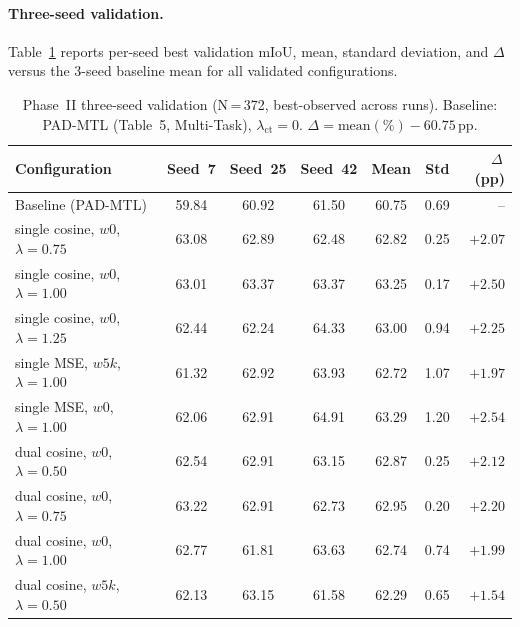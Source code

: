 \paragraph{Three-seed validation.}
Table~\ref{tab:ct-phase2-3seeds} reports per-seed best validation mIoU,
mean, standard deviation, and $\Delta$ versus the 3-seed baseline mean
for all validated configurations.

\begin{table}[H]
\centering
\caption{Phase~II three-seed validation (N\,=\,372, best-observed across
runs). Baseline: PAD-MTL (Table~5, Multi-Task), $\lambda_\text{ct}=0$.
$\Delta = \text{mean}(\%) - 60.75$\,pp.}
\label{tab:ct-phase2-3seeds}
\renewcommand{\arraystretch}{1.3}
\small
\begin{tabularx}{\textwidth}{Xcccccr}
\toprule
Configuration &
Seed~7 & Seed~25 & Seed~42 & Mean & Std & $\Delta$\,(pp) \\
\midrule
Baseline (PAD-MTL) &
59.84 & 60.92 & 61.50 & 60.75 & 0.69 & -- \\
\midrule
single cosine, $w0$, $\lambda=0.75$ &
63.08 & 62.89 & 62.48 & 62.82 & 0.25 & $+2.07$ \\
single cosine, $w0$, $\lambda=1.00$ &
63.01 & 63.37 & 63.37 & 63.25 & 0.17 & $+2.50$ \\
single cosine, $w0$, $\lambda=1.25$ &
62.44 & 62.24 & 64.33 & 63.00 & 0.94 & $+2.25$ \\
\midrule
single MSE, $w5k$, $\lambda=1.00$ &
61.32 & 62.92 & 63.93 & 62.72 & 1.07 & $+1.97$ \\
single MSE, $w0$, $\lambda=1.00$ &
62.06 & 62.91 & 64.91 & 63.29 & 1.20 & $+2.54$ \\
\midrule
dual cosine, $w0$, $\lambda=0.50$ &
62.54 & 62.91 & 63.15 & 62.87 & 0.25 & $+2.12$ \\
dual cosine, $w0$, $\lambda=0.75$ &
63.22 & 62.91 & 62.73 & 62.95 & 0.20 & $+2.20$ \\
dual cosine, $w0$, $\lambda=1.00$ &
62.77 & 61.81 & 63.63 & 62.74 & 0.74 & $+1.99$ \\
dual cosine, $w5k$, $\lambda=0.50$ &
62.13 & 63.15 & 61.58 & 62.29 & 0.65 & $+1.54$ \\
\bottomrule
\end{tabularx}
\end{table}

